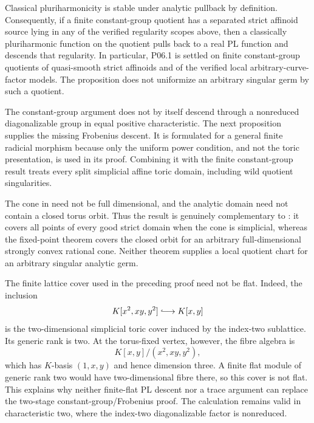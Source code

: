 Classical pluriharmonicity is stable under analytic pullback by definition.
Consequently, if a finite constant-group quotient has a separated strict
affinoid source lying in any of the verified regularity scopes above, then a
classically pluriharmonic function on the quotient pulls back to a real PL
function and  descends that
regularity.  In particular, P06.1 is settled on finite constant-group
quotients of quasi-smooth strict affinoids and of the verified local
arbitrary-curve-factor models.  The proposition does not uniformize an
arbitrary singular germ by such a quotient.

The constant-group argument does not by itself descend through a
nonreduced diagonalizable group in equal positive characteristic.  The next
proposition supplies the missing Frobenius descent.  It is formulated for a
general finite radicial morphism because only the uniform power condition,
and not the toric presentation, is used in its proof.  Combining it with the
finite constant-group result treats every split simplicial affine toric
domain, including wild quotient singularities.




The cone in  need not be full
dimensional, and the analytic domain need not contain a closed torus orbit.
Thus the result is genuinely complementary to
: it covers all points of every
good strict domain when the cone is simplicial, whereas the fixed-point
theorem covers the closed orbit for an arbitrary full-dimensional strongly
convex rational cone.  Neither theorem supplies a local quotient chart for
an arbitrary singular analytic germ.

\begin{example}
\label{ex:p061-simplicial-cover-not-flat}
The finite lattice cover used in the preceding proof need not be flat.
Indeed, the inclusion
\[
                     K[x^2,xy,y^2]\lhook\joinrel\longrightarrow K[x,y]
\]
is the two-dimensional simplicial toric cover induced by the index-two
sublattice.  Its generic rank is two.  At the torus-fixed vertex, however,
the fibre algebra is
\[
 K[x,y]/(x^2,xy,y^2),
\]
which has \(K\)-basis \((1,x,y)\) and hence dimension three.  A finite flat
module of generic rank two would have two-dimensional fibre there, so this
cover is not flat.  This explains why neither finite-flat PL descent nor a
trace argument can replace the two-stage constant-group/Frobenius proof.
The calculation remains valid in characteristic two, where the index-two
diagonalizable factor is nonreduced.
\end{example}

